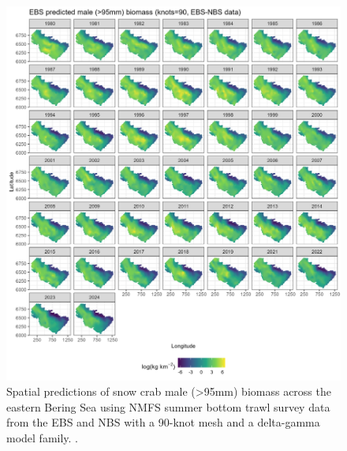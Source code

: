 \documentclass[
]{article}
\begin{document}
\begin{figure}

{\centering \includegraphics[width=1\linewidth,height=1\textheight]{../SNOW/Figures/EBSNBS-90-DG-Male95_spatbio} 

}

\caption{Spatial predictions of snow crab male (>95mm) biomass across the eastern Bering Sea using NMFS summer bottom trawl survey data from the EBS and NBS with a 90-knot mesh and a delta-gamma model family. .}\label{fig:snow-spatpred-bio-90-male-EBSNBS}
\end{figure}
\end{document}
